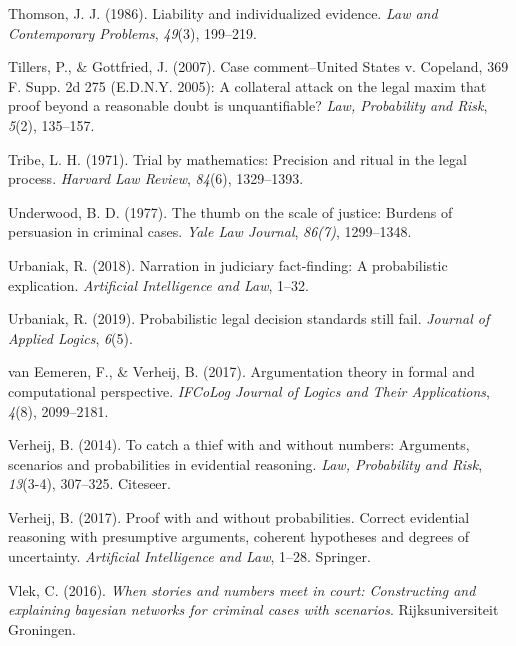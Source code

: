 \documentclass[11pt,dvipsnames,enabledeprecatedfontcommands]{scrartcl}
\begin{document}
\leavevmode\hypertarget{ref-Thomson86}{}%
Thomson, J. J. (1986). Liability and individualized evidence. \emph{Law
and Contemporary Problems}, \emph{49}(3), 199--219.

\leavevmode\hypertarget{ref-Tillers2007}{}%
Tillers, P., \& Gottfried, J. (2007). Case comment--United States v.
Copeland, 369 F. Supp. 2d 275 (E.D.N.Y. 2005): A collateral attack on
the legal maxim that proof beyond a reasonable doubt is unquantifiable?
\emph{Law, Probability and Risk}, \emph{5}(2), 135--157.

\leavevmode\hypertarget{ref-tribe71}{}%
Tribe, L. H. (1971). Trial by mathematics: Precision and ritual in the
legal process. \emph{Harvard Law Review}, \emph{84}(6), 1329--1393.

\leavevmode\hypertarget{ref-Underwood1977The-thumb-on-th}{}%
Underwood, B. D. (1977). The thumb on the scale of justice: Burdens of
persuasion in criminal cases. \emph{Yale Law Journal}, \emph{86(7)},
1299--1348.

\leavevmode\hypertarget{ref-urbaniak2018narration}{}%
Urbaniak, R. (2018). Narration in judiciary fact-finding: A
probabilistic explication. \emph{Artificial Intelligence and Law},
1--32.

\leavevmode\hypertarget{ref-Urbaniak2019standards2}{}%
Urbaniak, R. (2019). Probabilistic legal decision standards still fail.
\emph{Journal of Applied Logics}, \emph{6}(5).

\leavevmode\hypertarget{ref-vanEemeren2017}{}%
van Eemeren, F., \& Verheij, B. (2017). Argumentation theory in formal
and computational perspective. \emph{IFCoLog Journal of Logics and Their
Applications}, \emph{4}(8), 2099--2181.

\leavevmode\hypertarget{ref-verheij2014catch}{}%
Verheij, B. (2014). To catch a thief with and without numbers:
Arguments, scenarios and probabilities in evidential reasoning.
\emph{Law, Probability and Risk}, \emph{13}(3-4), 307--325. Citeseer.

\leavevmode\hypertarget{ref-verheijproof2017}{}%
Verheij, B. (2017). Proof with and without probabilities. Correct
evidential reasoning with presumptive arguments, coherent hypotheses and
degrees of uncertainty. \emph{Artificial Intelligence and Law}, 1--28.
Springer.

\leavevmode\hypertarget{ref-vlek2016stories}{}%
Vlek, C. (2016). \emph{When stories and numbers meet in court:
Constructing and explaining bayesian networks for criminal cases with
scenarios}. Rijksuniversiteit Groningen.
\end{document}
